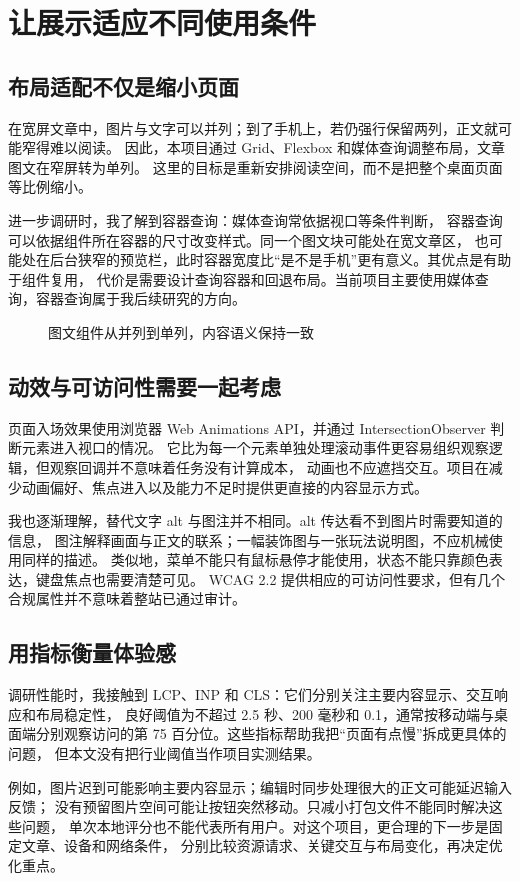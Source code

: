 \section{让展示适应不同使用条件}
\subsection{布局适配不仅是缩小页面}
在宽屏文章中，图片与文字可以并列；到了手机上，若仍强行保留两列，正文就可能窄得难以阅读。%
因此，本项目通过 Grid、Flexbox 和媒体查询调整布局，文章图文在窄屏转为单列。%
这里的目标是重新安排阅读空间，而不是把整个桌面页面等比例缩小。

进一步调研时，我了解到容器查询：媒体查询常依据视口等条件判断，%
容器查询可以依据组件所在容器的尺寸改变样式\cite{mdn-container}。同一个图文块可能处在宽文章区，%
也可能处在后台狭窄的预览栏，此时容器宽度比“是不是手机”更有意义。其优点是有助于组件复用，%
代价是需要设计查询容器和回退布局。当前项目主要使用媒体查询，容器查询属于我后续研究的方向。

\begin{figure}[H]
\centering

\caption{图文组件从并列到单列，内容语义保持一致}%
\label{fig:responsive}
\end{figure}

\subsection{动效与可访问性需要一起考虑}
页面入场效果使用浏览器 Web Animations API，并通过 IntersectionObserver
判断元素进入视口的情况\cite{local-code,mdn-waapi}。%
它比为每一个元素单独处理滚动事件更容易组织观察逻辑，但观察回调并不意味着任务没有计算成本，%
动画也不应遮挡交互。项目在减少动画偏好、焦点进入以及能力不足时提供更直接的内容显示方式。

我也逐渐理解，替代文字 alt 与图注并不相同。alt 传达看不到图片时需要知道的信息，%
图注解释画面与正文的联系；一幅装饰图与一张玩法说明图，不应机械使用同样的描述。%
类似地，菜单不能只有鼠标悬停才能使用，状态不能只靠颜色表达，键盘焦点也需要清楚可见。%
WCAG 2.2 提供相应的可访问性要求，但有几个合规属性并不意味着整站已通过审计\cite{wcag22}。

\subsection{用指标衡量体验感}
调研性能时，我接触到 LCP、INP 和 CLS：它们分别关注主要内容显示、交互响应和布局稳定性，%
良好阈值为不超过 2.5 秒、200 毫秒和 0.1，通常按移动端与桌面端分别观察访问的第 75
百分位\cite{web-vitals}。这些指标帮助我把“页面有点慢”拆成更具体的问题，%
但本文没有把行业阈值当作项目实测结果。

例如，图片迟到可能影响主要内容显示；编辑时同步处理很大的正文可能延迟输入反馈；%
没有预留图片空间可能让按钮突然移动。只减小打包文件不能同时解决这些问题，%
单次本地评分也不能代表所有用户。对这个项目，更合理的下一步是固定文章、设备和网络条件，%
分别比较资源请求、关键交互与布局变化，再决定优化重点。

